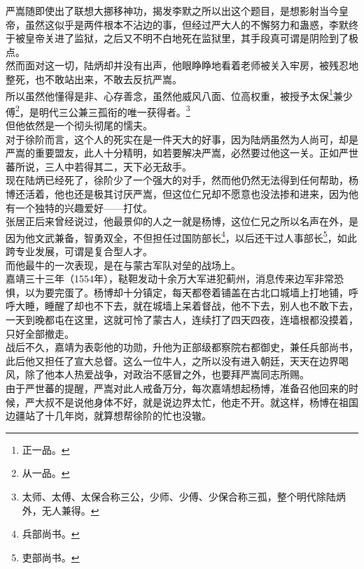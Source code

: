 \begin{multicols}{\theparacolNo}
严嵩随即使出了联想大挪移神功，揭发李默之所以出这个题目，是想影射当今皇帝，虽然这似乎是两件根本不沾边的事，但经过严大人的不懈努力和蛊惑，李默终于被皇帝关进了监狱，之后又不明不白地死在监狱里，其手段真可谓是阴险到了极点。\\

然而面对这一切，陆炳却并没有出声，他眼睁睁地看着老师被关入牢房，被残忍地整死，也不敢站出来，不敢去反抗严嵩。\\

所以虽然他懂得是非、心存善念，虽然他威风八面、位高权重，被授予太保\footnote{正一品。}兼少傅\footnote{从一品。}，是明代三公兼三孤衔的唯一获得者。\footnote{太师、太傅、太保合称三公，少师、少傅、少保合称三孤，整个明代除陆炳外，无人兼得。}\\

但他依然是一个彻头彻尾的懦夫。\\

对于徐阶而言，这个人的死实在是一件天大的好事，因为陆炳虽然为人尚可，却是严嵩的重要盟友，此人十分精明，如若要解决严嵩，必然要过他这一关。正如严世蕃所说，三人中若得其二，天下必无敌手。\\

现在陆炳已经死了，徐阶少了一个强大的对手，然而他仍然无法得到任何帮助，杨博还活着，他也还是极其讨厌严嵩，但这位仁兄却不愿意也没法掺和进来，因为他有一个独特的兴趣爱好——打仗。\\

张居正后来曾经说过，他最景仰的人之一就是杨博，这位仁兄之所以名声在外，是因为他文武兼备，智勇双全，不但担任过国防部长\footnote{兵部尚书。}，以后还干过人事部长\footnote{吏部尚书。}，如此跨专业发展，可谓是复合型人才。\\

而他最牛的一次表现，是在与蒙古军队对垒的战场上。\\

嘉靖三十三年（1554年），鞑靼发动十余万大军进犯蓟州，消息传来边军非常恐惧，以为要完蛋了。杨博却十分镇定，每天都卷着铺盖在古北口城墙上打地铺，呼呼大睡，睡醒了却也不下去，就在城墙上呆着督战，他不下去，别人也不敢下去，一天到晚都屯在这里，这就可怜了蒙古人，连续打了四天四夜，连墙根都没摸着，只好全部撤走。\\

战后不久，嘉靖为表彰他的功勋，升他为正部级都察院右都御史，兼任兵部尚书，此后他又担任了宣大总督。这么一位牛人，之所以没有进入朝廷，天天在边界喝风，除了他本人热爱战争，对政治不感冒之外，也要拜严嵩同志所赐。\\

由于严世蕃的提醒，严嵩对此人戒备万分，每次嘉靖想起杨博，准备召他回来的时候，严大叔不是说他身体不好，就是说边界太忙，他走不开。就这样，杨博在祖国边疆站了十几年岗，就算想帮徐阶的忙也没辙。\\


\end{multicols}
